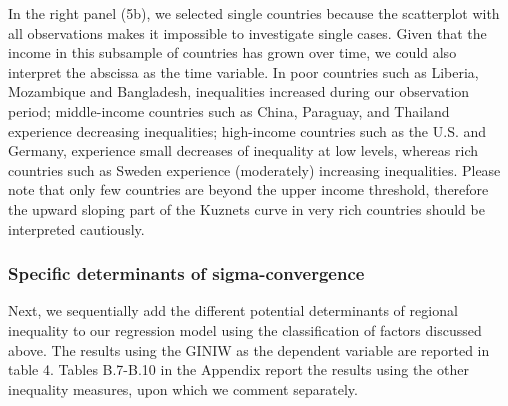 \documentclass[10pt]{article}
\begin{document}
In the right panel (5b), we selected single countries because the scatterplot with all observations makes it impossible to investigate single cases. Given that the income in this subsample of countries has grown over time, we could also interpret the abscissa as the time variable. In poor countries such as Liberia, Mozambique and Bangladesh, inequalities increased during our observation period; middle-income countries such as China, Paraguay, and Thailand experience decreasing inequalities; high-income countries such as the U.S. and Germany, experience small decreases of inequality at low levels, whereas rich countries such as Sweden experience (moderately) increasing inequalities. Please note that only few countries are beyond the upper income threshold, therefore the upward sloping part of the Kuznets curve in very rich countries should be interpreted cautiously.

\subsubsection{Specific determinants of sigma-convergence}
Next, we sequentially add the different potential determinants of regional inequality to our regression model using the classification of factors discussed above. The results using the GINIW as the dependent variable are reported in table 4. Tables B.7-B.10 in the Appendix report the results using the other inequality measures, upon which we comment separately.
\end{document}
